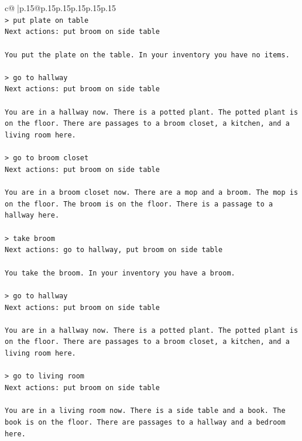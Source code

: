 \documentclass{article}
\begin{document}
{\begin{supertabular}{c@{$\;$}|p{.15\linewidth}@{}p{.15\linewidth}p{.15\linewidth}p{.15\linewidth}p{.15\linewidth}p{.15\linewidth}}
{{{\\ 
\texttt{> put plate on table  } \\
\texttt{Next actions: put broom on side table} \\
\\ 
\texttt{You put the plate on the table. In your inventory you have no items.} \\
\\ 
\texttt{> go to hallway  } \\
\texttt{Next actions: put broom on side table} \\
\\ 
\texttt{You are in a hallway now. There is a potted plant. The potted plant is on the floor. There are passages to a broom closet, a kitchen, and a living room here.} \\
\\ 
\texttt{> go to broom closet  } \\
\texttt{Next actions: put broom on side table} \\
\\ 
\texttt{You are in a broom closet now. There are a mop and a broom. The mop is on the floor. The broom is on the floor. There is a passage to a hallway here.} \\
\\ 
\texttt{> take broom  } \\
\texttt{Next actions: go to hallway, put broom on side table} \\
\\ 
\texttt{You take the broom. In your inventory you have a broom.} \\
\\ 
\texttt{> go to hallway  } \\
\texttt{Next actions: put broom on side table} \\
\\ 
\texttt{You are in a hallway now. There is a potted plant. The potted plant is on the floor. There are passages to a broom closet, a kitchen, and a living room here.} \\
\\ 
\texttt{> go to living room  } \\
\texttt{Next actions: put broom on side table} \\
\\ 
\texttt{You are in a living room now. There is a side table and a book. The book is on the floor. There are passages to a hallway and a bedroom here.} \\
\\ 
}}}
\end{supertabular}}
\end{document}
